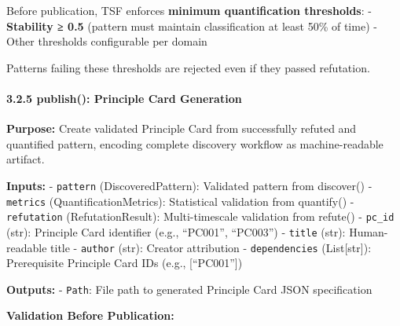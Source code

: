 \documentclass[
]{article}
\begin{document}
Before publication, TSF enforces \textbf{minimum quantification
thresholds}: - \textbf{Stability ≥ 0.5} (pattern must maintain
classification at least 50\% of time) - Other thresholds configurable
per domain

Patterns failing these thresholds are rejected even if they passed
refutation.

\paragraph{3.2.5 publish(): Principle Card
Generation}\label{publish-principle-card-generation}

\textbf{Purpose:} Create validated Principle Card from successfully
refuted and quantified pattern, encoding complete discovery workflow as
machine-readable artifact.

\textbf{Inputs:} - \texttt{pattern} (DiscoveredPattern): Validated
pattern from discover() - \texttt{metrics} (QuantificationMetrics):
Statistical validation from quantify() - \texttt{refutation}
(RefutationResult): Multi-timescale validation from refute() -
\texttt{pc\_id} (str): Principle Card identifier (e.g., ``PC001'',
``PC003'') - \texttt{title} (str): Human-readable title -
\texttt{author} (str): Creator attribution - \texttt{dependencies}
(List{[}str{]}): Prerequisite Principle Card IDs (e.g., {[}``PC001''{]})

\textbf{Outputs:} - \texttt{Path}: File path to generated Principle Card
JSON specification

\textbf{Validation Before Publication:}
\end{document}
